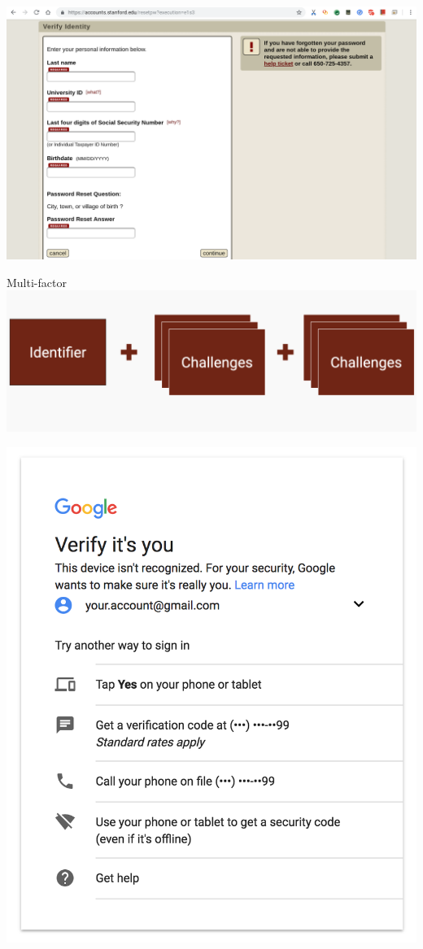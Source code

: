 \documentclass[nobackground,dvipsnames,table,aspectratio=169]{beamer}
\begin{document}
\begin{frame}{}
    \centering
    \includegraphics[width=\textwidth]{stanford-id-verification}
\end{frame}

\begin{frame}{Multi-factor}
    \includegraphics[width=\textwidth]{multifactor-auth}
\end{frame}

\begin{frame}{}
    \centering
    \includegraphics[height=0.92\textheight]{google-2fa}
\end{frame}
\end{document}

